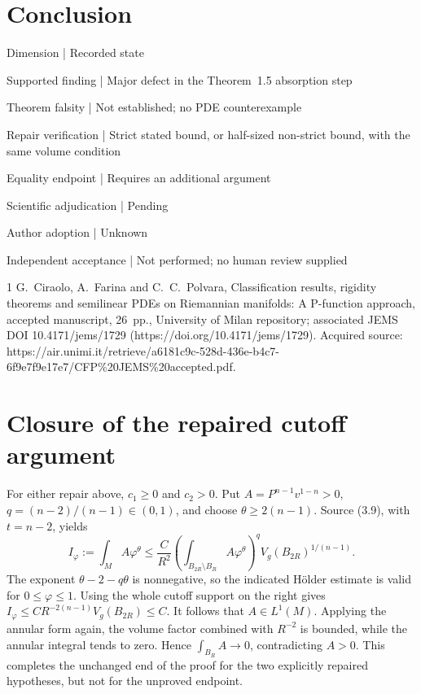 \documentclass[10pt]{article}
\begin{document}
\section*{Conclusion}
Dimension | Recorded state\par
Supported finding | Major defect in the Theorem 1.5 absorption step\par
Theorem falsity | Not established; no PDE counterexample\par
Repair verification | Strict stated bound, or half-sized non-strict bound, with the same volume condition\par
Equality endpoint | Requires an additional argument\par
Scientific adjudication | Pending\par
Author adoption | Unknown\par
Independent acceptance | Not performed; no human review supplied\par
1 G. Ciraolo, A. Farina and C. C. Polvara, Classification results, rigidity theorems and semilinear PDEs on Riemannian manifolds: A P-function approach, accepted manuscript, 26 pp., University of Milan repository; associated JEMS DOI 10.4171/jems/1729 (https://doi.org/10.4171/jems/1729). Acquired source: https://air.unimi.it/retrieve/a6181c9c-528d-436e-b4c7-6f9e7f9e17e7/CFP\%20JEMS\%20accepted.pdf.\par
\section*{Closure of the repaired cutoff argument}
For either repair above, \(c_1\ge0\) and \(c_2>0\). Put \(A=P^{n-1}v^{1-n}>0\), \(q=(n-2)/(n-1)\in(0,1)\), and choose \(\theta\ge2(n-1)\). Source (3.9), with \(t=n-2\), yields \[I_\varphi:=\int_M A\varphi^\theta
 \le \frac{C}{R^2}
   \left(\int_{B_{2R}\setminus B_R}A\varphi^\theta\right)^q
   V_g(B_{2R})^{1/(n-1)}.\] The exponent \(\theta-2-q\theta\) is nonnegative, so the indicated Hölder estimate is valid for \(0\le\varphi\le1\). Using the whole cutoff support on the right gives \(I_\varphi\le CR^{-2(n-1)}V_g(B_{2R})\le C\). It follows that \(A\in L^1(M)\). Applying the annular form again, the volume factor combined with \(R^{-2}\) is bounded, while the annular integral tends to zero. Hence \(\int_{B_R}A\to0\), contradicting \(A>0\). This completes the unchanged end of the proof for the two explicitly repaired hypotheses, but not for the unproved endpoint.\par
\end{document}
